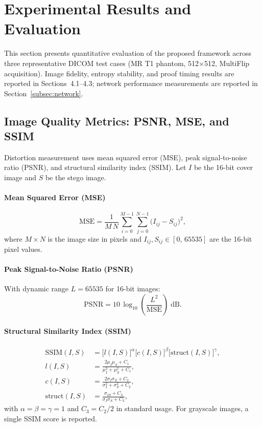 \documentclass{jstarticle}
\begin{document}
\section{Experimental Results and Evaluation}
\label{sec:results}

This section presents quantitative evaluation of the proposed framework across three representative DICOM test cases (MR T1 phantom, 512$\times$512, MultiFlip acquisition).
Image fidelity, entropy stability, and proof timing results are reported in Sections~4.1--4.3; network performance measurements are reported in Section~\ref{subsec:network}.

\subsection{Image Quality Metrics: PSNR, MSE, and SSIM}

Distortion measurement uses mean squared error (MSE), peak signal-to-noise ratio (PSNR), and structural similarity index (SSIM).
Let $I$ be the 16-bit cover image and $S$ be the stego image.

\paragraph{Mean Squared Error (MSE)}
\begin{equation}
\mathrm{MSE} = \frac{1}{M\,N} \sum_{i=0}^{M-1} \sum_{j=0}^{N-1}
\bigl(I_{ij} - S_{ij}\bigr)^2,
\label{eq:mse}
\end{equation}
where $M \times N$ is the image size in pixels and $I_{ij}, S_{ij} \in [0,\, 65535]$ are the 16-bit pixel values.

\paragraph{Peak Signal-to-Noise Ratio (PSNR)}
With dynamic range $L = 65535$ for 16-bit images:
\begin{equation}
\mathrm{PSNR} = 10\,\log_{10}\!\left(\frac{L^2}{\mathrm{MSE}}\right)
\;\text{dB}.
\label{eq:psnr}
\end{equation}

\paragraph{Structural Similarity Index (SSIM)}
\begin{align}
\mathrm{SSIM}(I, S) &=
  \bigl[l(I,S)\bigr]^{\alpha}
  \bigl[c(I,S)\bigr]^{\beta}
  \bigl[\mathrm{struct}(I,S)\bigr]^{\gamma},
  \label{eq:ssim-prod}\\
l(I,S) &= \frac{2\mu_I\mu_S + C_1}{\mu_I^2 + \mu_S^2 + C_1},
  \label{eq:ssim-l}\\
c(I,S) &= \frac{2\sigma_I\sigma_S + C_2}{\sigma_I^2 + \sigma_S^2 + C_2},
  \label{eq:ssim-c}\\
\mathrm{struct}(I,S) &= \frac{\sigma_{IS} + C_3}{\sigma_I\sigma_S + C_3},
  \label{eq:ssim-s}
\end{align}
with $\alpha = \beta = \gamma = 1$ and $C_3 = C_2/2$ in standard usage.
For grayscale images, a single SSIM score is reported.
\end{document}
